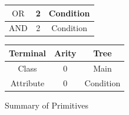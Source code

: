 \documentclass[a4paper,12pt]{article}
\begin{document}
{\begin{figure}[h!]
\begin{minipage}[c]{0.5\textwidth}
\begin{tabular}{|c|c|c|}
                            $\text{OR}$ & 2 & Condition \\
                            \hline
                            $\text{AND}$ & 2 & Condition \\
                            \hline
                        \end{tabular}
                    \end{minipage}
                        \begin{minipage}[c]{0.5\textwidth}
                        \centering
                        \begin{tabular}{|c|c|c|}
                            \hline
                            \textbf{Terminal} & \textbf{Arity} & \textbf{Tree}\\
                            \hline
                            Class & 0 & Main \\
                            \hline
                            Attribute & 0 & Condition  \\
                            \hline  
                        \end{tabular}
                    \end{minipage}
                    \caption{Summary of Primitives}
                \end{figure} 
            }
        \newpage
\end{document}
